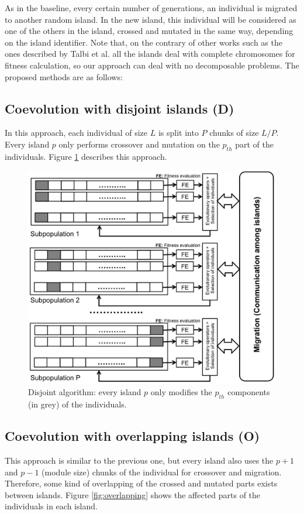 \documentclass[preprint]{elsarticle}
\begin{document}
As in the baseline, every certain number of generations, an individual is migrated to another random island.  In the new island, this individual will be considered as one of the others in the island, crossed and mutated in the same way, depending on the island identifier. Note that, on the contrary of other works such as the ones described by Talbi et al. \citep{Talbi08Parallel} all the islands deal with complete chromosomes for fitness calculation, so our approach can deal with no decomposable problems. The proposed methods  are as follows:

\subsection{Coevolution with disjoint islands (D)} 
In this approach, each individual of size $L$ is split into $P$ chunks of size $L/P$. Every island $p$ only performs crossover and mutation on the $p_{th}$ part of the individuals. Figure \ref{fig:disjoint} describes this approach.  

\begin{figure}
\centering
\includegraphics[width=12cm]{islandDisjoint.jpg}
\caption{Disjoint algorithm: every island $p$ only modifies the $p_{th}$ components (in grey) of the individuals.}
\label{fig:disjoint}
\end{figure}

\subsection{Coevolution with overlapping islands (O)}
This approach is similar to the previous one, but every island also uses the $p+1$ and $p-1$ (module size) chunks of the individual for crossover and migration. Therefore, some kind of overlapping of the crossed and mutated parts exists between islands. Figure \ref{fig:overlapping} shows the affected parts of the individuals in
each island. 
\end{document}
